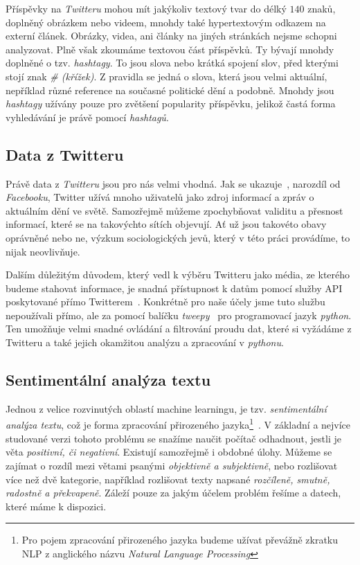 \documentclass[12pt, a4paper]{article}
\numberwithin{equation}{section} 	%
\begin{document}
Příspěvky na \textit{Twitteru} mohou mít jakýkoliv textový tvar do délký $140$ znaků, doplněný obrázkem nebo videem, mnohdy také hypertextovým odkazem na externí článek. Obrázky, videa, ani články na jiných stránkách nejsme schopni analyzovat. Plně však zkoumáme textovou část příspěvků. Ty bývají mnohdy doplněné o tzv. \textit{hashtagy}. To jsou slova nebo krátká spojení slov, před kterými stojí znak \textit{\# (křížek)}. Z pravidla se jedná o slova, která jsou velmi aktuální, nepříklad různé reference na současné politické dění a podobně. Mnohdy jsou \textit{hashtagy} užívány pouze pro zvětšení popularity příspěvku, jelikož častá forma vyhledávání je právě pomocí \textit{hashtagů}.

\subsection{Data z Twitteru}
\noindent Právě data z \textit{Twitteru} jsou pro nás velmi vhodná. Jak se ukazuje~\cite{whyNotFb}, narozdíl od \textit{Facebooku}, Twitter užívá mnoho uživatelů jako zdroj informací a zpráv o aktuálním dění ve světě. Samozřejmě můžeme zpochybňovat validitu a přesnost informací, které se na takovýchto sítích objevují. Ať už jsou takovéto obavy oprávněné nebo ne, výzkum sociologických jevů, který v této práci provádíme, to nijak neovlivňuje.

Dalším důležitým důvodem, který vedl k výběru Twitteru jako média, ze kterého budeme stahovat informace, je snadná přístupnost k datům pomocí služby API poskytované přímo Twitterem~\cite{twitterAPI}. Konkrétně pro naše účely jsme tuto službu nepoužívali přímo, ale za pomocí balíčku \textit{tweepy}~\cite{tweepy} pro programovací jazyk \textit{python}. Ten umožňuje velmi snadné ovládání a filtrování proudu dat, které si vyžádáme z Twitteru a také jejich okamžitou analýzu a zpracování v \textit{pythonu}.

\subsection{Sentimentální analýza textu}
\noindent Jednou z velice rozvinutých oblastí machine learningu, je tzv. \textit{sentimentální analýza textu}, což je forma zpracování přirozeného jazyka\footnote{Pro pojem zpracování přirozeného jazyka budeme užívat převážně zkratku NLP z anglického názvu \textit{Natural Language Processing}}~\cite{NLTKbook}. V základní a nejvíce studované verzi tohoto problému se snažíme naučit počítač odhadnout, jestli je věta \textit{positivní, či negativní}. Existují samozřejmě i obdobné úlohy. Můžeme se zajímat o rozdíl mezi větami psanými \textit{objektivně a subjektivně}, nebo rozlišovat více než dvě kategorie, například rozlišovat texty napsané \textit{rozčíleně, smutně, radostně a překvapeně}. Záleží pouze za jakým účelem problém řešíme a datech, které máme k dispozici.
\end{document}
